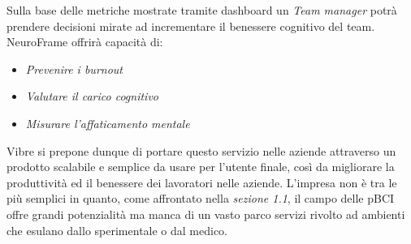\noindent Sulla base delle metriche mostrate tramite dashboard un \emph{Team manager} potrà prendere decisioni mirate ad incrementare il benessere cognitivo del team.\newline
NeuroFrame offrirà capacità di:
\begin{itemize}
  \item \emph{Prevenire i burnout}
  \item \emph{Valutare il carico cognitivo}
  \item \emph{Misurare l'affaticamento mentale}
\end{itemize}
\vspace{10mm}
\noindent Vibre si prepone dunque di portare questo servizio nelle aziende attraverso un prodotto scalabile e semplice da usare per l'utente finale, così da migliorare la produttività ed il benessere dei lavoratori nelle aziende.\newline
L'impresa non è tra le più semplici in quanto, come affrontato nella \emph{sezione 1.1}, il campo delle pBCI offre grandi potenzialità ma manca di un vasto parco servizi rivolto ad ambienti che esulano dallo sperimentale o dal medico.
